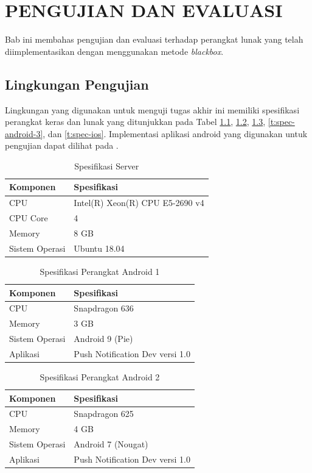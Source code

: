 \chapter{PENGUJIAN DAN EVALUASI}
\par Bab ini membahas pengujian dan evaluasi terhadap perangkat lunak yang telah diimplementasikan dengan menggunakan metode \textit{blackbox}.

\section{Lingkungan Pengujian}
\par Lingkungan yang digunakan untuk menguji tugas akhir ini memiliki spesifikasi perangkat keras dan lunak yang ditunjukkan pada Tabel \ref{t:spec-server}, \ref{t:spec-android}, \ref{t:spec-android-2}, \ref{t:spec-android-3}, dan \ref{t:spec-ios}. Implementasi aplikasi android yang digunakan untuk pengujian dapat dilihat pada .
\begin{longtable}{|p{3cm}|p{6cm}|}
	\caption{Spesifikasi Server} \label{t:spec-server} \\ \hline
    \rowcolor{lightgray} Komponen & Spesifikasi \\ \hline
    CPU & Intel(R) Xeon(R) CPU E5-2690 v4 \\ \hline
    CPU Core & 4 \\ \hline
    Memory & 8 GB \\ \hline
    Sistem Operasi & Ubuntu 18.04 \\ \hline
\end{longtable}
\begin{longtable}{|p{3cm}|p{6cm}|}
	\caption{Spesifikasi Perangkat Android 1} \label{t:spec-android} \\ \hline
	\rowcolor{lightgray} Komponen & Spesifikasi \\ \hline
    CPU & Snapdragon 636 \\ \hline
    Memory & 3 GB \\ \hline
    Sistem Operasi & Android 9 (Pie) \\ \hline
    Aplikasi & Push Notification Dev versi 1.0 \\ \hline
\end{longtable}
\pagebreak
\begin{longtable}{|p{3cm}|p{6cm}|}
\caption{Spesifikasi Perangkat Android 2} \label{t:spec-android-2} \\ \hline
\rowcolor{lightgray} Komponen & Spesifikasi \\ \hline
CPU & Snapdragon 625 \\ \hline
Memory & 4 GB \\ \hline
Sistem Operasi & Android 7 (Nougat) \\ \hline
Aplikasi & Push Notification Dev versi 1.0 \\ \hline
\end{longtable}
